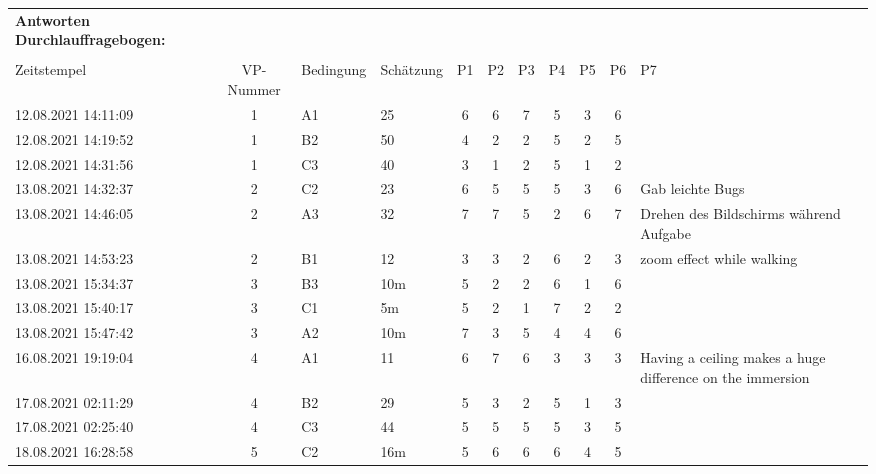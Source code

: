 \begin{landscape} %
    \label{anhang:durchlauf-antworten}
\begin{table}[]
\begin{tabular}{lcllccccccp{7cm}}
\textbf{Antworten Durchlauffragebogen:} \\ \\
Zeitstempel         & VP-Nummer & Bedingung         & Schätzung & P1 & P2 & P3 & P4 & P5 & P6 & P7                                                        \\
12.08.2021 14:11:09 & 1 & A1  & 25  & 6  & 6  & 7  & 5  & 3  & 6 &                                                           \\
12.08.2021 14:19:52 & 1 & B2  & 50  & 4  & 2  & 2  & 5  & 2  & 5 &                                                           \\
12.08.2021 14:31:56 & 1 & C3  & 40  & 3  & 1  & 2  & 5  & 1  & 2 &                                                           \\
13.08.2021 14:32:37 & 2 & C2  & 23  & 6  & 5  & 5  & 5  & 3  & 6 & Gab leichte Bugs                                          \\
13.08.2021 14:46:05 & 2 & A3  & 32  & 7  & 7  & 5  & 2  & 6  & 7 & Drehen des Bildschirms während Aufgabe                    \\
13.08.2021 14:53:23 & 2 & B1  & 12  & 3  & 3  & 2  & 6  & 2  & 3 & zoom effect while walking                                 \\
13.08.2021 15:34:37 & 3 & B3  & 10m & 5  & 2  & 2  & 6  & 1  & 6 &                                                           \\
13.08.2021 15:40:17 & 3 & C1  & 5m  & 5  & 2  & 1  & 7  & 2  & 2 &                                                           \\
13.08.2021 15:47:42 & 3 & A2  & 10m & 7  & 3  & 5  & 4  & 4  & 6 & \\
16.08.2021 19:19:04 & 4 & A1  & 11  & 6  & 7  & 6  & 3  & 3  & 3 & Having a ceiling makes a huge difference on the immersion \\
17.08.2021 02:11:29 & 4 & B2  & 29  & 5  & 3  & 2  & 5  & 1  & 3 &                                                           \\
17.08.2021 02:25:40 & 4 & C3  & 44  & 5  & 5  & 5  & 5  & 3  & 5 &                                                           \\
18.08.2021 16:28:58 & 5 & C2  & 16m & 5  & 6  & 6  & 6  & 4  & 5 &                                                           \\

\end{tabular}
\end{table}
\end{landscape}
